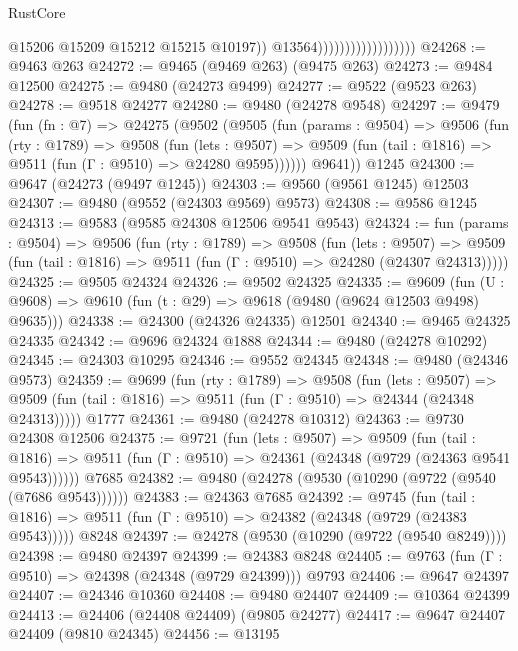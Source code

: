 \begin{lexlean}{RustCore}
\begin{coremodule}
                                            @15206
                                            @15209
                                            @15212
                                            @15215
                                            @10197))
                                        @13564))))))))))))))))))
@24268 := @9463 @263
@24272 := @9465 (@9469 @263) (@9475 @263)
@24273 := @9484 @12500
@24275 := @9480 (@24273 @9499)
@24277 := @9522 (@9523 @263)
@24278 := @9518 @24277
@24280 := @9480 (@24278 @9548)
@24297 := @9479
    (fun (fn : @7) =>
    @24275
      (@9502
        (@9505
          (fun (params : @9504) =>
          @9506
            (fun (rty : @1789) =>
            @9508
              (fun (lets : @9507) =>
              @9509 (fun (tail : @1816) => @9511 (fun (Γ : @9510) => @24280 @9595))))))
        @9641))
    @1245
@24300 := @9647 (@24273 (@9497 @1245))
@24303 := @9560 (@9561 @1245) @12503
@24307 := @9480 (@9552 (@24303 @9569) @9573)
@24308 := @9586 @1245
@24313 := @9583 (@9585 @24308 @12506 @9541 @9543)
@24324 := fun (params : @9504) =>
  @9506
    (fun (rty : @1789) =>
    @9508
      (fun (lets : @9507) =>
      @9509 (fun (tail : @1816) => @9511 (fun (Γ : @9510) => @24280 (@24307 @24313)))))
@24325 := @9505 @24324
@24326 := @9502 @24325
@24335 := @9609
    (fun (U : @9608) => @9610 (fun (t : @29) => @9618 (@9480 (@9624 @12503 @9498) @9635)))
@24338 := @24300 (@24326 @24335) @12501
@24340 := @9465 @24325 @24335
@24342 := @9696 @24324 @1888
@24344 := @9480 (@24278 @10292)
@24345 := @24303 @10295
@24346 := @9552 @24345
@24348 := @9480 (@24346 @9573)
@24359 := @9699
    (fun (rty : @1789) =>
    @9508
      (fun (lets : @9507) =>
      @9509 (fun (tail : @1816) => @9511 (fun (Γ : @9510) => @24344 (@24348 @24313)))))
    @1777
@24361 := @9480 (@24278 @10312)
@24363 := @9730 @24308 @12506
@24375 := @9721
    (fun (lets : @9507) =>
    @9509
      (fun (tail : @1816) =>
      @9511 (fun (Γ : @9510) => @24361 (@24348 (@9729 (@24363 @9541 @9543))))))
    @7685
@24382 := @9480 (@24278 (@9530 (@10290 (@9722 (@9540 (@7686 @9543))))))
@24383 := @24363 @7685
@24392 := @9745
    (fun (tail : @1816) => @9511 (fun (Γ : @9510) => @24382 (@24348 (@9729 (@24383 @9543)))))
    @8248
@24397 := @24278 (@9530 (@10290 (@9722 (@9540 @8249))))
@24398 := @9480 @24397
@24399 := @24383 @8248
@24405 := @9763 (fun (Γ : @9510) => @24398 (@24348 (@9729 @24399))) @9793
@24406 := @9647 @24397
@24407 := @24346 @10360
@24408 := @9480 @24407
@24409 := @10364 @24399
@24413 := @24406 (@24408 @24409) (@9805 @24277)
@24417 := @9647 @24407 @24409 (@9810 @24345)
@24456 := @13195

\end{coremodule}
\end{lexlean}
